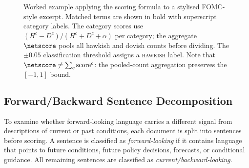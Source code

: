 \begin{figure}[htbp]
\caption[Worked example: text-to-score pipeline]{Worked example
applying the scoring formula to a stylised FOMC-style excerpt.
Matched terms are shown in bold with superscript category labels.
The category scores use $(H^c{-}D^c)/(H^c{+}D^c{+}\alpha)$ per category;
the aggregate $\netscore$ pools all hawkish and dovish counts before
dividing. The $\pm 0.05$ classification threshold assigns a
\textsc{hawkish} label. Note that $\netscore \neq \sum_c
\text{score}^c$: the pooled-count aggregation preserves the $[-1,1]$
bound.}
\label{fig:scoring_example}
\end{figure}


\subsection{Forward/Backward Sentence Decomposition}
\label{sec:meth_fwd_bwd}

To examine whether forward-looking language carries a different
signal from descriptions of current or past conditions, each
document is split into sentences before scoring. A sentence is
classified as \emph{forward-looking} if it contains language that
points to future conditions, future policy decisions, forecasts, or
conditional guidance. All remaining sentences are classified as
\emph{current/backward-looking}.

